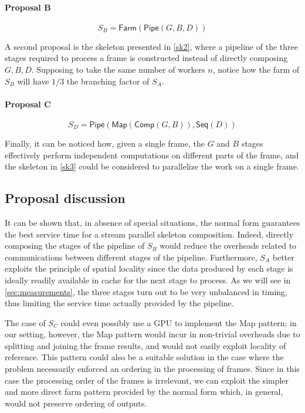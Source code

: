 \documentclass{article}
\begin{document}
\paragraph{Proposal B} 

\begin{equation}\label{sk2}
S_B = \textsf{Farm}(\textsf{Pipe}(G,B,D))
\end{equation}

A second proposal is the skeleton presented in \autoref{sk2}, where a pipeline of the three stages required to process a frame is constructed instead of directly composing $G,B,D$. Supposing to take the same number of workers $n$, notice how the farm of $S_B$ will have $1/3$ the branching factor of $S_A$.

\paragraph{Proposal C}

\begin{equation}\label{sk3}
S_D = \textsf{Pipe}(\textsf{Map}(\textsf{Comp}(G,B)),\textsf{Seq}(D))
\end{equation}

Finally, it can be noticed how, given a single frame, the $G$ and $B$ stages effectively perform independent computations on different parts of the frame, and the skeleton in \autoref{sk3} could be considered to parallelize the work on a single frame.

\subsection{Proposal discussion}

It can be shown that, in absence of special situations, the normal form guarantees the best service time for a stream parallel skeleton composition. Indeed, directly composing the stages of the pipeline of $S_B$ would reduce the overheads related to communications between different stages of the pipeline. Furthermore, $S_A$ better exploits the principle of spatial locality since the data produced by each stage is ideally readily available in cache for the next stage to process. As we will see in \autoref{sec:measurements}, the three stages turn out to be very unbalanced in timing, thus limiting the service time actually provided by the pipeline.

The case of $S_C$ could even possibly use a GPU to implement the \textsf{Map} pattern; in our setting, however, the \textsf{Map} pattern would incur in non-trivial overheads due to splitting and joining the frame results, and would not easily exploit locality of reference. This pattern could also be a suitable solution in the case where the problem necessarily enforced an ordering in the processing of frames. Since in this case the processing order of the frames is irrelevant, we can exploit the simpler and more direct farm pattern provided by the normal form which, in general, would not preserve ordering of outputs.
\end{document}
